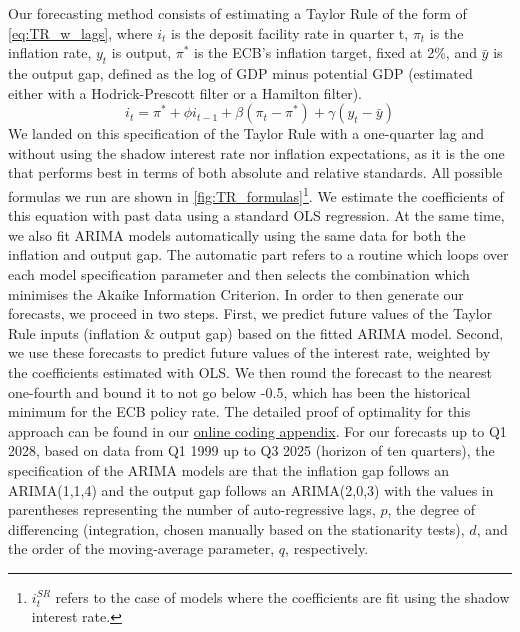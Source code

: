 Our forecasting method consists of estimating a Taylor Rule of the form of \eqref{eq:TR_w_lags}, where $i_t$ is the deposit facility rate in quarter t, $\pi_t$ is the inflation rate, $y_t$ is output, $\pi^*$ is the ECB's inflation target, fixed at 2\%, and $\bar{y}$ is the output gap, defined as the log of GDP minus potential GDP (estimated either with a Hodrick-Prescott filter or a Hamilton filter). 
\begin{equation}
    i_t = \pi^* + \phi i_{t-1} + \beta (\pi_t - \pi^*)+\gamma (y_t-\bar{y}) \label{eq:TR_w_lags}
\end{equation}
We landed on this specification of the Taylor Rule with a one-quarter lag and without using the shadow interest rate nor inflation expectations, as it is the one that performs best in terms of both absolute and relative standards. All possible formulas we run are shown in \autoref{fig:TR_formulas}\footnote{$i_t^{SR}$ refers to the case of models where the coefficients are fit using the shadow interest rate.}. We estimate the coefficients of this equation with past data using a standard OLS regression. At the same time, we also fit ARIMA models automatically using the same data for both the inflation and output gap. The automatic part refers to a routine which loops over each model specification parameter and then selects the combination which minimises the Akaike Information Criterion. In order to then generate our forecasts, we proceed in two steps. First, we predict future values of the Taylor Rule inputs (inflation \& output gap) based on the fitted ARIMA model. Second, we use these forecasts to predict future values of the interest rate, weighted by the coefficients estimated with OLS. We then round the forecast to the nearest one-fourth and bound it to not go below -0.5, which has been the historical minimum for the ECB policy rate. The detailed proof of optimality for this approach can be found in our \href{https://github.com/theshufflebee/therockcast/blob/main/ECB_Project.pdf}{online coding appendix}. For our forecasts up to Q1 2028, based on data from Q1 1999 up to Q3 2025 (horizon of ten quarters), the specification of the ARIMA models are that the inflation gap follows an ARIMA(1,1,4) and the output gap follows an ARIMA(2,0,3) with the values in parentheses representing the number of auto-regressive lags, $p$, the degree of differencing (integration, chosen manually based on the stationarity tests), $d$, and the order of the moving-average parameter, $q$, respectively.

